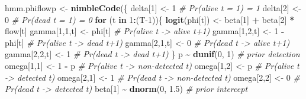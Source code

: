 \documentclass[
  12pt,
]{krantz}
\newenvironment{Shaded}{\begin{snugshade}}{\end{snugshade}}
\newcommand{\CommentTok}[1]{\textcolor[rgb]{0.56,0.35,0.01}{\textit{#1}}}
\newcommand{\ControlFlowTok}[1]{\textcolor[rgb]{0.13,0.29,0.53}{\textbf{#1}}}
\newcommand{\DecValTok}[1]{\textcolor[rgb]{0.00,0.00,0.81}{#1}}
\newcommand{\FloatTok}[1]{\textcolor[rgb]{0.00,0.00,0.81}{#1}}
\newcommand{\FunctionTok}[1]{\textcolor[rgb]{0.13,0.29,0.53}{\textbf{#1}}}
\newcommand{\NormalTok}[1]{#1}
\newcommand{\OtherTok}[1]{\textcolor[rgb]{0.56,0.35,0.01}{#1}}
\newcommand{\SpecialCharTok}[1]{\textcolor[rgb]{0.81,0.36,0.00}{\textbf{#1}}}
\begin{document}
\begin{Shaded}
\begin{Highlighting}[]
\NormalTok{hmm.phiflowp }\OtherTok{\textless{}{-}} \FunctionTok{nimbleCode}\NormalTok{(\{}
\NormalTok{  delta[}\DecValTok{1}\NormalTok{] }\OtherTok{\textless{}{-}} \DecValTok{1}          \CommentTok{\# Pr(alive t = 1) = 1}
\NormalTok{  delta[}\DecValTok{2}\NormalTok{] }\OtherTok{\textless{}{-}} \DecValTok{0}          \CommentTok{\# Pr(dead t = 1) = 0}
  \ControlFlowTok{for}\NormalTok{ (t }\ControlFlowTok{in} \DecValTok{1}\SpecialCharTok{:}\NormalTok{(T}\DecValTok{{-}1}\NormalTok{))\{}
    \FunctionTok{logit}\NormalTok{(phi[t]) }\OtherTok{\textless{}{-}}\NormalTok{ beta[}\DecValTok{1}\NormalTok{] }\SpecialCharTok{+}\NormalTok{ beta[}\DecValTok{2}\NormalTok{] }\SpecialCharTok{*}\NormalTok{ flow[t] }
\NormalTok{    gamma[}\DecValTok{1}\NormalTok{,}\DecValTok{1}\NormalTok{,t] }\OtherTok{\textless{}{-}}\NormalTok{ phi[t]      }\CommentTok{\# Pr(alive t {-}\textgreater{} alive t+1)}
\NormalTok{    gamma[}\DecValTok{1}\NormalTok{,}\DecValTok{2}\NormalTok{,t] }\OtherTok{\textless{}{-}} \DecValTok{1} \SpecialCharTok{{-}}\NormalTok{ phi[t]  }\CommentTok{\# Pr(alive t {-}\textgreater{} dead t+1)}
\NormalTok{    gamma[}\DecValTok{2}\NormalTok{,}\DecValTok{1}\NormalTok{,t] }\OtherTok{\textless{}{-}} \DecValTok{0}        \CommentTok{\# Pr(dead t {-}\textgreater{} alive t+1)}
\NormalTok{    gamma[}\DecValTok{2}\NormalTok{,}\DecValTok{2}\NormalTok{,t] }\OtherTok{\textless{}{-}} \DecValTok{1}        \CommentTok{\# Pr(dead t {-}\textgreater{} dead t+1)}
\NormalTok{  \}}
\NormalTok{  p }\SpecialCharTok{\textasciitilde{}} \FunctionTok{dunif}\NormalTok{(}\DecValTok{0}\NormalTok{, }\DecValTok{1}\NormalTok{) }\CommentTok{\# prior detection}
\NormalTok{  omega[}\DecValTok{1}\NormalTok{,}\DecValTok{1}\NormalTok{] }\OtherTok{\textless{}{-}} \DecValTok{1} \SpecialCharTok{{-}}\NormalTok{ p    }\CommentTok{\# Pr(alive t {-}\textgreater{} non{-}detected t)}
\NormalTok{  omega[}\DecValTok{1}\NormalTok{,}\DecValTok{2}\NormalTok{] }\OtherTok{\textless{}{-}}\NormalTok{ p        }\CommentTok{\# Pr(alive t {-}\textgreater{} detected t)}
\NormalTok{  omega[}\DecValTok{2}\NormalTok{,}\DecValTok{1}\NormalTok{] }\OtherTok{\textless{}{-}} \DecValTok{1}        \CommentTok{\# Pr(dead t {-}\textgreater{} non{-}detected t)}
\NormalTok{  omega[}\DecValTok{2}\NormalTok{,}\DecValTok{2}\NormalTok{] }\OtherTok{\textless{}{-}} \DecValTok{0}        \CommentTok{\# Pr(dead t {-}\textgreater{} detected t)}
\NormalTok{  beta[}\DecValTok{1}\NormalTok{] }\SpecialCharTok{\textasciitilde{}} \FunctionTok{dnorm}\NormalTok{(}\DecValTok{0}\NormalTok{, }\FloatTok{1.5}\NormalTok{) }\CommentTok{\# prior intercept}

\end{Highlighting}
\end{Shaded}
\end{document}
